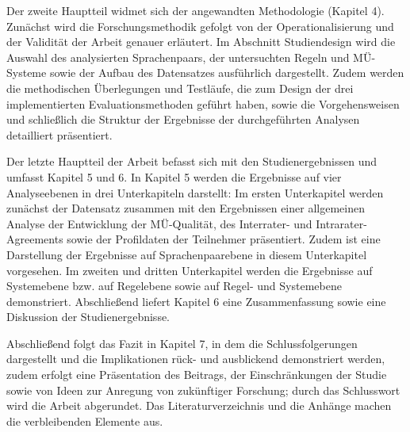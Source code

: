 Der zweite Hauptteil widmet sich der angewandten Methodologie (Kapitel 4). Zunächst wird die Forschungsmethodik gefolgt von der Operationalisierung und der Validität der Arbeit genauer erläutert. Im Abschnitt Studiendesign wird die Auswahl des analysierten Sprachenpaars, der untersuchten Regeln und MÜ-Systeme sowie der Aufbau des Datensatzes ausführlich dargestellt. Zudem werden die methodischen Überlegungen und Testläufe, die zum Design der drei implementierten Evaluationsmethoden geführt haben, sowie die Vorgehensweisen und schließlich die Struktur der Ergebnisse der durchgeführten Analysen detailliert präsentiert.

Der letzte Hauptteil der Arbeit befasst sich mit den Studienergebnissen und umfasst Kapitel 5 und 6. In Kapitel 5 werden die Ergebnisse auf vier Analyseebenen in drei Unterkapiteln darstellt: Im ersten Unterkapitel werden zunächst der Datensatz zusammen mit den Ergebnissen einer allgemeinen Analyse der Entwicklung der MÜ-Qualität, des Interrater- und Intrarater-Agreements sowie der Profildaten der Teilnehmer präsentiert. Zudem ist eine Darstellung der Ergebnisse auf Sprachenpaarebene in diesem Unterkapitel vorgesehen. Im zweiten und dritten Unterkapitel werden die Ergebnisse auf Systemebene bzw. auf Regelebene sowie auf Regel- und Systemebene demonstriert. Abschließend liefert Kapitel 6 eine Zusammenfassung sowie eine Diskussion der Studienergebnisse. 

Abschließend folgt das Fazit in Kapitel 7, in dem die Schlussfolgerungen dargestellt und die Implikationen rück- und ausblickend demonstriert werden, zudem erfolgt eine Präsentation des Beitrags, der Einschränkungen der Studie sowie von Ideen zur Anregung von zukünftiger Forschung; durch das Schlusswort wird die Arbeit abgerundet. Das Literaturverzeichnis und die Anhänge machen die verbleibenden Elemente aus.

